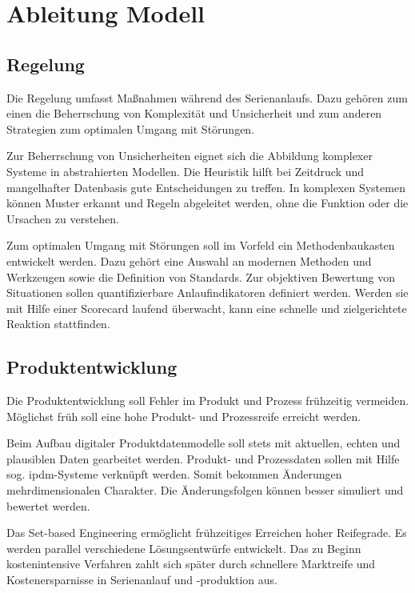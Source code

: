 \chapter{Ableitung Modell}\label{sec:ableitung}

\section{Regelung}

Die Regelung umfasst Maßnahmen während des Serienanlaufs. Dazu gehören zum einen die Beherrschung von Komplexität und Unsicherheit und zum anderen Strategien zum optimalen Umgang mit Störungen. 

Zur Beherrschung von Unsicherheiten eignet sich die Abbildung komplexer Systeme in abstrahierten Modellen. Die Heuristik hilft bei Zeitdruck und mangelhafter Datenbasis gute Entscheidungen zu treffen. In komplexen Systemen können Muster erkannt und Regeln abgeleitet werden, ohne die Funktion oder die Ursachen zu verstehen. 

Zum optimalen Umgang mit Störungen soll im Vorfeld ein Methodenbaukasten entwickelt werden. Dazu gehört eine Auswahl an modernen Methoden und Werkzeugen sowie die Definition von Standards. Zur objektiven Bewertung von Situationen sollen quantifizierbare Anlaufindikatoren definiert werden. Werden sie mit Hilfe einer Scorecard laufend überwacht, kann eine schnelle und zielgerichtete Reaktion stattfinden. 

\section{Produktentwicklung}

Die Produktentwicklung soll Fehler im Produkt und Prozess frühzeitig vermeiden. Möglichst früh soll eine hohe Produkt- und Prozessreife erreicht werden. 

Beim Aufbau digitaler Produktdatenmodelle soll stets mit aktuellen, echten und plausiblen Daten gearbeitet werden. Produkt- und Prozessdaten sollen mit Hilfe sog. \gls{ipdm}-Systeme verknüpft werden. Somit bekommen Änderungen mehrdimensionalen Charakter. Die Änderungsfolgen können besser simuliert und bewertet werden. 

Das Set-based Engineering ermöglicht frühzeitiges Erreichen hoher Reifegrade. Es werden parallel verschiedene Lösungsentwürfe entwickelt. Das zu Beginn kostenintensive Verfahren zahlt sich später durch schnellere Marktreife und Kostenersparnisse in Serienanlauf und -produktion aus. 

